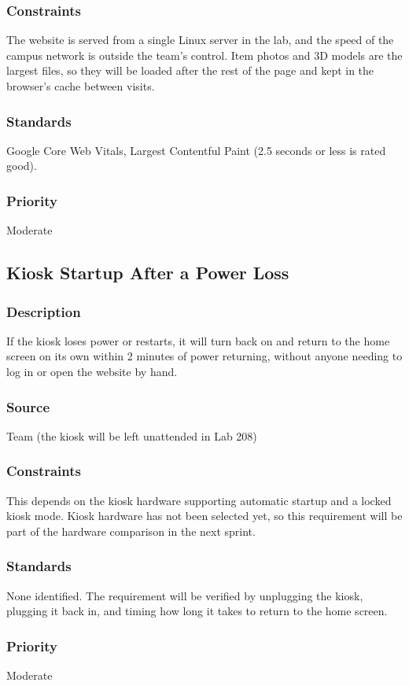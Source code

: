 \subsubsection{Constraints}
The website is served from a single Linux server in the lab, and the speed of the campus network is outside the team's control. Item photos and 3D models are the largest files, so they will be loaded after the rest of the page and kept in the browser's cache between visits.
\subsubsection{Standards}
Google Core Web Vitals, Largest Contentful Paint (2.5 seconds or less is rated good).
\subsubsection{Priority}
Moderate

\subsection{Kiosk Startup After a Power Loss}
\subsubsection{Description}
If the kiosk loses power or restarts, it will turn back on and return to the home screen on its own within 2 minutes of power returning, without anyone needing to log in or open the website by hand.
\subsubsection{Source}
Team (the kiosk will be left unattended in Lab 208)
\subsubsection{Constraints}
This depends on the kiosk hardware supporting automatic startup and a locked kiosk mode. Kiosk hardware has not been selected yet, so this requirement will be part of the hardware comparison in the next sprint.
\subsubsection{Standards}
None identified. The requirement will be verified by unplugging the kiosk, plugging it back in, and timing how long it takes to return to the home screen.
\subsubsection{Priority}
Moderate
